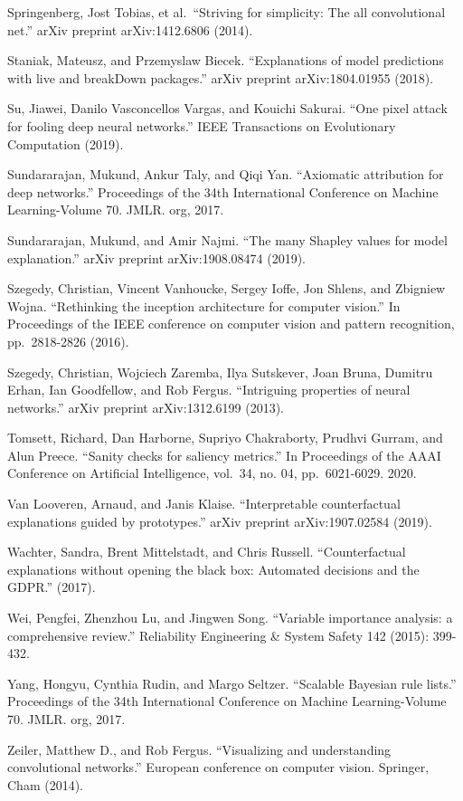 \documentclass[
  10pt,
]{scrbook}
\begin{document}
Springenberg, Jost Tobias, et al.~``Striving for simplicity: The all convolutional net.'' arXiv preprint arXiv:1412.6806 (2014).

Staniak, Mateusz, and Przemyslaw Biecek. ``Explanations of model predictions with live and breakDown packages.'' arXiv preprint arXiv:1804.01955 (2018).

Su, Jiawei, Danilo Vasconcellos Vargas, and Kouichi Sakurai. ``One pixel attack for fooling deep neural networks.'' IEEE Transactions on Evolutionary Computation (2019).

Sundararajan, Mukund, Ankur Taly, and Qiqi Yan. ``Axiomatic attribution for deep networks.'' Proceedings of the 34th International Conference on Machine Learning-Volume 70. JMLR. org, 2017.

Sundararajan, Mukund, and Amir Najmi. ``The many Shapley values for model explanation.'' arXiv preprint arXiv:1908.08474 (2019).

Szegedy, Christian, Vincent Vanhoucke, Sergey Ioffe, Jon Shlens, and Zbigniew Wojna. ``Rethinking the inception architecture for computer vision.'' In Proceedings of the IEEE conference on computer vision and pattern recognition, pp.~2818-2826 (2016).

Szegedy, Christian, Wojciech Zaremba, Ilya Sutskever, Joan Bruna, Dumitru Erhan, Ian Goodfellow, and Rob Fergus. ``Intriguing properties of neural networks.'' arXiv preprint arXiv:1312.6199 (2013).

Tomsett, Richard, Dan Harborne, Supriyo Chakraborty, Prudhvi Gurram, and Alun Preece. ``Sanity checks for saliency metrics.'' In Proceedings of the AAAI Conference on Artificial Intelligence, vol.~34, no. 04, pp.~6021-6029. 2020.

Van Looveren, Arnaud, and Janis Klaise. ``Interpretable counterfactual explanations guided by prototypes.'' arXiv preprint arXiv:1907.02584 (2019).

Wachter, Sandra, Brent Mittelstadt, and Chris Russell. ``Counterfactual explanations without opening the black box: Automated decisions and the GDPR.'' (2017).

Wei, Pengfei, Zhenzhou Lu, and Jingwen Song. ``Variable importance analysis: a comprehensive review.'' Reliability Engineering \& System Safety 142 (2015): 399-432.

Yang, Hongyu, Cynthia Rudin, and Margo Seltzer. ``Scalable Bayesian rule lists.'' Proceedings of the 34th International Conference on Machine Learning-Volume 70. JMLR. org, 2017.

Zeiler, Matthew D., and Rob Fergus. ``Visualizing and understanding convolutional networks.'' European conference on computer vision. Springer, Cham (2014).
\end{document}
